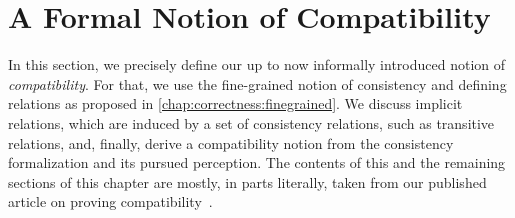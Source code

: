 \section{A Formal Notion of Compatibility}
\label{chap:compatibility:formal_notion}


In this section, we precisely define our up to now informally introduced notion of \emph{compatibility}.
For that, we use the fine-grained notion of consistency and defining relations as proposed in \autoref{chap:correctness:finegrained}.
We discuss implicit relations, which are induced by a set of consistency relations, such as transitive relations, and,
finally, derive a compatibility notion from the consistency formalization and its pursued perception.
The contents of this and the remaining sections of this chapter are mostly, in parts literally, taken from our published article on proving compatibility~.



